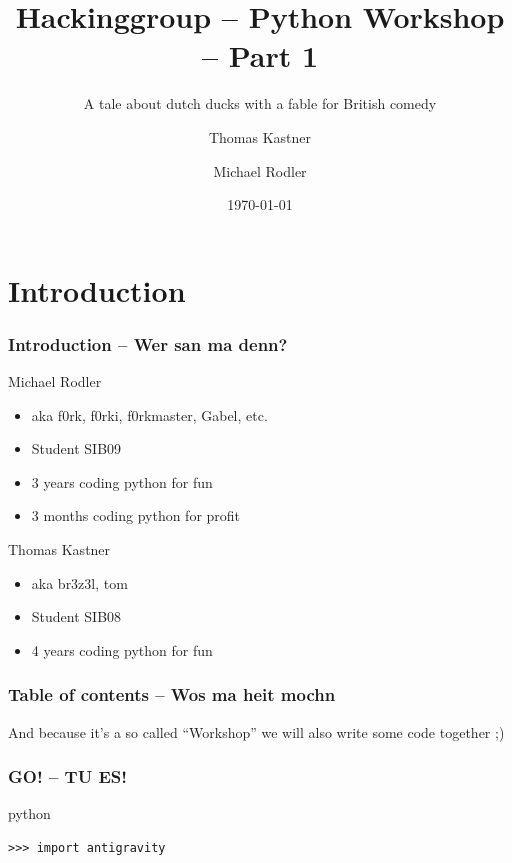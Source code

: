 \documentclass{beamer}
\title[Python Workshop]{Hackinggroup -- Python Workshop -- Part 1}
\subtitle{A tale about dutch ducks with a fable for British comedy}
\author[Thomas Kastner, Michael Rodler]{Thomas Kastner\and Michael Rodler}
\date{\today}
\begin{document}
\begin{frame}
    \titlepage
\end{frame}

\section*{Introduction}

\begin{frame}
    \frametitle{Introduction -- Wer san ma denn?}

    \begin{block}{Michael Rodler}
    \begin{itemize}
        \item aka f0rk, f0rki, f0rkmaster, Gabel, etc.
        \item Student SIB09
        \item 3 years coding python for fun
        \item 3 months coding python for profit
    \end{itemize}
    \end{block}

    \begin{block}{Thomas Kastner}
    \begin{itemize}
        \item aka br3z3l, tom
        \item Student SIB08
        \item 4 years coding python for fun
    \end{itemize}
    \end{block}
\end{frame}


\begin{frame}[fragile]
    \frametitle{Table of contents -- Wos ma heit mochn}
    \tableofcontents
    And because it's a so called ``Workshop'' we will also write some code together ;)
\end{frame}

\begin{frame}[fragile]
	\frametitle{GO! -- TU ES!}
\pause
    \begin{exampleblock}{python}
    \begin{lstlisting}
>>> import antigravity
    \end{lstlisting}
    \end{exampleblock}
\end{frame}
\end{document}
